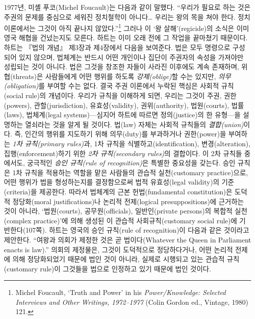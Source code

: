 \documentclass[12pt, oneside]{book}  %
\begin{document}
1977년, 미셸 푸코(Michel Foucault)는 다음과 같이 말했다. ``우리가 필요로
하는 것은 주권의 문제를 중심으로 세워진 정치철학이 아니다\ldots{} 우리는
왕의 목을 쳐야 한다. 정치이론에서는 그것이 아직 끝나지
않았다.''\footnote{Michel Foucault, `Truth and Power' in his
  \emph{Power/Knowledge: Selected Interviews and Other Writings,
  1972--1977} (Colin Gordon ed., Vintage, 1980) 121.} 그러나 이 `왕
살해'(regicide)의 소식은 이미 영국 해협을 건넜는지도 모른다. 하트는 이미
오래 전에 그 작업을 끝마쳤기 때문이다. 하트는 『법의 개념』 제3장과
제4장에서 다음을 보여준다. 법은 모두 명령으로 구성되어 있지 않으며,
법체계는 반드시 어떤 개인이나 집단이 주권자의 속성을 가져야만 성립되는
것이 아니다. 법은 그것을 창조한 자들이 사라진 이후에도 계속 존재하며,
위협(threats)은 사람들에게 어떤 행위를 하도록 \emph{강제(oblige)}할 수는
있지만, \emph{의무(obligation)}를 부여할 수는 없다. 결국 주권 이론에서
누락된 핵심은 사회적 규칙(social rule)의 개념이다. 우리가 규칙을
이해하게 되면, 우리는 그것이 주권, 권한(powers), 관할(jurisdiction),
유효성(validity), 권위(authority), 법원(courts), 법률(laws),
법체계(legal systems)---심지어 하트에 따르면 정의(justice)의 한
유형---을 설명하는 열쇠라는 것을 알게 될 것이다. 법(law) 자체는 사회적
규칙들의 \emph{결합(union)}이다. 즉, 인간의 행위를 지도하기 위해
의무(duty)를 부과하거나 권한(power)을 부여하는 \emph{1차 규칙(primary
rules)}과, 1차 규칙을 식별하고(identification), 변경(alteration),
집행(enforcement)하기 위한 \emph{2차 규칙(secondary rules)}의 결합이다.
이 2차 규칙들 중에서도, 궁극적인 \emph{승인 규칙(rule of recognition)}은
특별한 중요성을 갖는다. 승인 규칙은 1차 규칙을 적용하는 역할을 맡은
사람들의 관습적 실천(customary practice)으로, 어떤 행위가 법을
형성하는지를 결정함으로써 법적 유효성(legal validity)의 기준(criteria)을
제공한다. 따라서 법체계의 근본 헌법(fundamental constitution)은 도덕적
정당화(moral justifications)나 논리적 전제(logical presuppositions)에
근거하는 것이 아니라, `법원(courts), 공무원(officials), 일반인(private
persons)의 복합적 실천(complex practice)'에 의해 생성된 이 관습적
사회규칙(customary social rule)에 기반한다(107쪽). 하트는 영국의 승인
규칙(rule of recognition)이 다음과 같은 것이라고 제안한다. ``여왕과
의회가 제정한 것은 곧 법이다(Whatever the Queen in Parliament enacts is
law).'' 의회의 제정물은, 그것이 도덕적으로 정당하다거나, 어떤 논리적
전제에 의해 정당화되었기 때문에 법인 것이 아니라, 실제로 시행되고 있는
관습적 규칙(customary rule)이 그것들을 법으로 인정하고 있기 때문에 법인
것이다.
\end{document}
